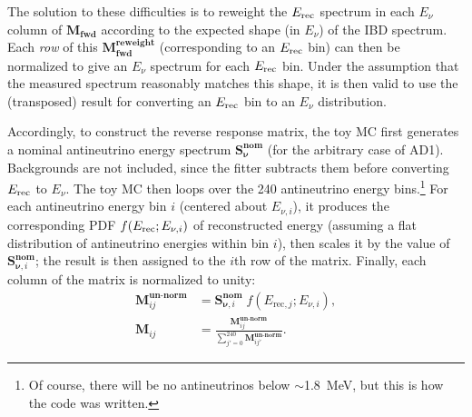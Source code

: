 \documentclass[../thesis.tex]{subfiles}
\begin{document}
The solution to these difficulties is to reweight the $E_\mathrm{rec}$ spectrum in each $E_\nu$ column of $\mathbf{M_{fwd}}$ according to the expected shape (in $E_\nu$) of the IBD spectrum.
Each \emph{row} of this $\mathbf{M_{fwd}^{reweight}}$ (corresponding to an $E_\mathrm{rec}$ bin) can then be normalized to give an $E_\nu$ spectrum for each $E_\mathrm{rec}$ bin. Under the assumption that the measured spectrum reasonably matches this shape, it is then valid to use the (transposed) result for converting an $E_\mathrm{rec}$ bin to an $E_\nu$ distribution.

\begin{comment}
\footnote{Given that the shape is distorted both by oscillations and by differences in the fission fractions, it is important to verify that the analysis is insensitive to such variations in the spectral shape. XXX, was this done?}
\end{comment}

\begin{comment}
  We should fix genEvisToEnuMatrix.C to turn off the theta13 oscillation, and then note below that oscillations are disabled.
\end{comment}

Accordingly, to construct the reverse response matrix, the toy MC first generates a nominal antineutrino energy spectrum $\mathbf{S^{nom}_\nu}$ (for the arbitrary case of AD1). Backgrounds are not included, since the fitter subtracts them before converting $E_\mathrm{rec}$ to $E_\nu$. The toy MC then loops over the 240 antineutrino energy bins.\footnote{Of course, there will be no antineutrinos below $\sim$1.8~MeV, but this is how the code was written.} For each antineutrino energy bin $i$ (centered about $E_{\nu,i}$), it produces the corresponding PDF $f(E_\mathrm{rec}; E_{\nu,i})$ of reconstructed energy (assuming a flat distribution of antineutrino energies within bin $i$), then scales it by the value of $\mathbf{S}^{\mathbf{nom}}_{\mathbf{\nu},i}$; the result is then assigned to the $i$th row of the matrix. Finally, each column of the matrix is normalized to unity:
\begin{align}
  \label{eq:revRespMtxUnNorm}
  \mathbf{M}^{\textbf{un-norm}}_{ij} &= \mathbf{S}^{\mathbf{nom}}_{\mathbf{\nu},i} \; f(E_{\mathrm{rec},j}; E_{\nu,i}), \\
  \label{eq:revRespMtx}
  \mathbf{M}_{ij} &= \frac{\mathbf{M}^{\textbf{un-norm}}_{ij}}{\sum_{j'=0}^{240} \mathbf{M}^{\textbf{un-norm}}_{ij'}}.
\end{align}
\end{document}
